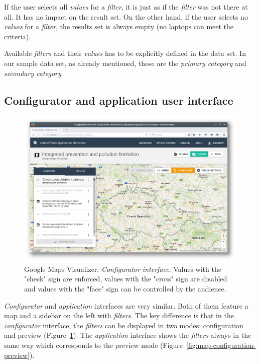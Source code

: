 If the user selects all \emph{values} for a \emph{filter}, it is just as if the \emph{filter} was not there at all. It has no impact on the result set. On the other hand, if the user selects no \emph{values} for a \emph{filter}, the results set is always empty (no laptops can meet the criteria).

Available \emph{filters} and their \emph{values} has to be explicitly defined in the data set. In our sample data set, as already mentioned, those are the \emph{primary category} and \emph{secondary category}.

\subsection{Configurator and application user interface}

\begin{figure}
	\centering
	\includegraphics[width=145mm]{img/06_map_configuration}
	\caption{Google Maps Visualizer: \emph{Configurator interface}. Values with the "check" sign are enforced, values with the "cross" sign are disabled and values with the "face" sign can be controlled by the audience.}
    \label{fig:map-configuration}
\end{figure}

\emph{Configurator} and \emph{application} interfaces are very similar. Both of them feature a map and a sidebar on the left with \emph{filters}. The key difference is that in the \emph{configurator} interface, the \emph{filters} can be displayed in two modes: configuration and preview (Figure~\ref{fig:map-configuration}). The \emph{application} interface shows the \emph{filters} always in the same way which corresponds to the preview mode (Figure~\ref{fig:map-configuration-preview}).

